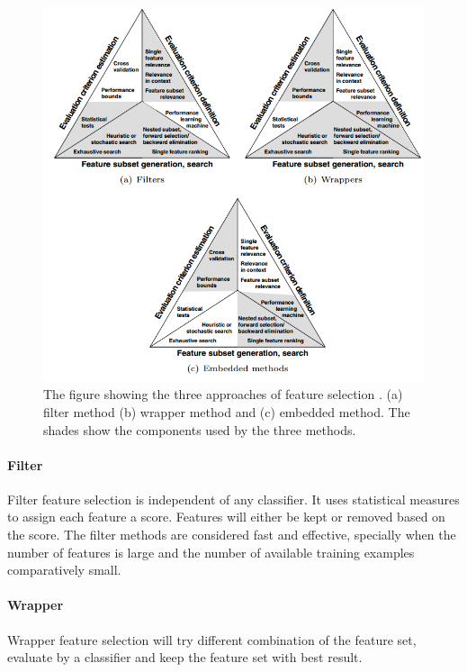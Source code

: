 \documentclass[USenglish]{ifimaster}  %
\begin{document}
	
	\begin{figure}[h]
		\centering
		\includegraphics[scale=0.7]{Figures/FilterWrapperEmbedded.PNG}
		\caption{The figure showing the three approaches of feature selection \cite{Guyon2006}. (a) filter method (b) wrapper method and (c) embedded method.  The shades show the components used by the three methods.}
		\label{fig:selection}
	\end{figure}
	
	
\paragraph{Filter}
Filter feature selection is independent of any classifier. It uses statistical measures to assign each feature a score. Features will either be kept or removed based on the score. The filter methods are considered fast and effective, specially when the number of features is large and the number of available training examples comparatively small.  
	
	
\paragraph{Wrapper}
Wrapper feature selection will try different combination of the feature set, evaluate by a classifier and keep the feature set with best result.
	
\end{document}
